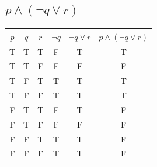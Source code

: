 \documentclass[a4paper, 10pt]{article}
\begin{document}
        \subsection{\( p \land (\neg q \lor r) \)}
            \begin{tabular}{|c|c|c|c|c|c|}
                \hline
                \( p \) & \( q \) & \( r \) & \( \neg q \) & \( \neg q \lor r \) & \( p \land (\neg q \lor r) \) \\
                \hline
                T & T & T & F & T & T \\
                T & T & F & F & F & F \\
                T & F & T & T & T & T \\
                T & F & F & T & T & T \\
                F & T & T & F & T & F \\
                F & T & F & F & F & F \\
                F & F & T & T & T & F \\
                F & F & F & T & T & F \\
                \hline
            \end{tabular}
\end{document}
